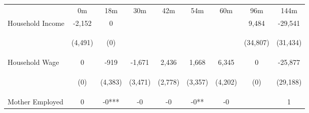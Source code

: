 \begin{tabular}{lcccccccc}
\hline \noalign{\smallskip} & 0m & 18m & 30m & 42m & 54m & 60m & 96m & 144m\\
\noalign{\smallskip}\hline \noalign{\smallskip}Household Income & -2,152 & 0 &  &  &  &  & 9,484 & -29,541\\
 & \begin{footnotesize}(4,491)\end{footnotesize} & \begin{footnotesize}(0)\end{footnotesize} & \begin{footnotesize}\end{footnotesize} & \begin{footnotesize}\end{footnotesize} & \begin{footnotesize}\end{footnotesize} & \begin{footnotesize}\end{footnotesize} & \begin{footnotesize}(34,807)\end{footnotesize} & \begin{footnotesize}(31,434)\end{footnotesize}\\
\noalign{\smallskip}Household Wage & 0 & -919 & -1,671 & 2,436 & 1,668 & 6,345 & 0 & -25,877\\
 & \begin{footnotesize}(0)\end{footnotesize} & \begin{footnotesize}(4,383)\end{footnotesize} & \begin{footnotesize}(3,471)\end{footnotesize} & \begin{footnotesize}(2,778)\end{footnotesize} & \begin{footnotesize}(3,357)\end{footnotesize} & \begin{footnotesize}(4,202)\end{footnotesize} & \begin{footnotesize}(0)\end{footnotesize} & \begin{footnotesize}(29,188)\end{footnotesize}\\
\noalign{\smallskip}Mother Employed & 0 & -0*** & -0 & -0 & -0** & -0 &  & 1\\

\end{tabular}
